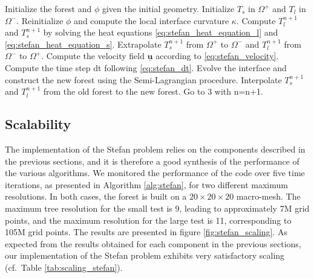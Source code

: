 \begin{algorithm}[htbp]
\caption{$\texttt{General procedure for solving the Stefan problem}$}
\begin{algorithmic}[1]
\State Initialize the forest and $\phi$ given the initial geometry.
\State Initialize $T_s$ in $\Omega^+$ and $T_l$ in $\Omega^-$.
\State Reinitialize $\phi$ and compute the local interface curvature $\kappa$.
\State Compute $T^{n+1}_l$ and $T^{n+1}_s$ by solving the heat equations \eqref{eq:stefan_heat_equation_l} and \eqref{eq:stefan_heat_equation_s}.
\State Extrapolate $T^{n+1}_s$ from $\Omega^+$ to $\Omega^-$ and $T^{n+1}_l$ from $\Omega^-$ to $\Omega^+$.
\State Compute the velocity field $\underline{\mathbf{u}}$ according to \eqref{eq:stefan_velocity}.
\State Compute the time step dt following \eqref{eq:stefan_dt}.
\State Evolve the interface and construct the new forest using the Semi-Lagrangian procedure.
\State Interpolate $T^{n+1}_s$ and $T^{n+1}_l$ from the old forest to the new forest.
\State Go to 3 with n=n+1.
\end{algorithmic}
\label{alg:stefan}
\end{algorithm}

\subsection{Scalability}

The implementation of the Stefan problem relies on the components described in the previous sections, and it is therefore a good synthesis of the performance of the various algorithms. We monitored the performance of the code over five time iterations, as presented in Algorithm \ref{alg:stefan}, for two different maximum resolutions. In both cases, the forest is built on a $20\times20\times20$ macro-mesh. The maximum tree resolution for the small test is 9, leading to approximately 7M grid points, and the maximum resolution for the large test is 11, corresponding to 105M grid points. The results are presented in figure \ref{fig:stefan_scaling}. As expected from the results obtained for each component in the previous sections, our implementation of the Stefan problem exhibits very satisfactory scaling (cf.\ Table \ref{tab:scaling_stefan}).

